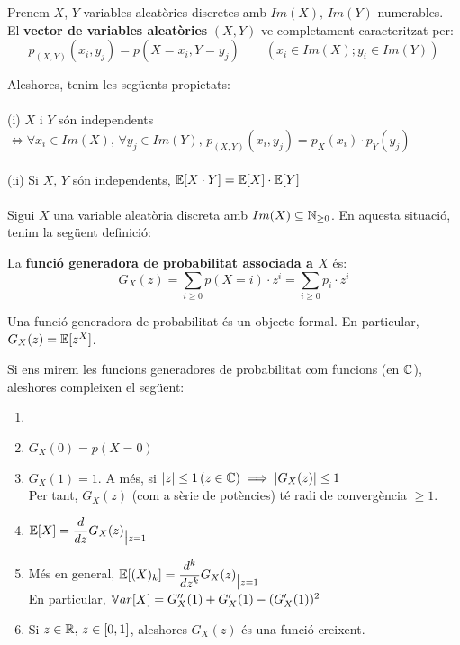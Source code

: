 \begin{defi}
  Prenem $X$, $Y$ variables aleatòries discretes amb $Im(X), \, Im(Y)$ numerables. \\
  El \textbf{vector de variables aleatòries} $(X,Y)$ ve completament caracteritzat per: 
  \[
    p_{(X,Y)}(x_{i},y_{j}) = p(X=x_{i}, Y=y_{j}) \qquad (x_{i}\in Im(X); y_{i}\in Im(Y))
  \]
\end{defi}

\newpage
Aleshores, tenim les següents propietats: \\\\
(i) $X$ i $Y$ són independents $\iff \forall x_{i}\in Im(X), \, \forall y_{j}\in Im(Y), 
\, p_{(X, Y)}(x_{i},y_{j}) = p_{X}(x_{i})\cdot p_{Y}(y_{j})$ \\\\
(ii) Si $X, \, Y$ són independents, $\mathbb{E}[X\cdot Y] = \mathbb{E}[X]\cdot \mathbb{E}[Y]$ \\\\

Sigui $X$ una variable aleatòria discreta amb $Im(X)\subseteq \mathbb{N}_{\geq0}$. En aquesta situació, 
tenim la següent definició:

\begin{defi}
  La \textbf{funció generadora de probabilitat associada a $X$} és: 
  \[
    G_{X}(z) = \sum_{i\geq 0}p(X=i)\cdot z^{i} = \sum_{i\geq 0}p_{i}\cdot z^{i}
  \]
  
  Una funció generadora de probabilitat és un objecte formal. En particular, $G_{X}(z)=\mathbb{E}[z^{X}]$.
\end{defi}

Si ens mirem les funcions generadores de probabilitat com funcions (en $\mathbb{C}$), aleshores compleixen el següent:

\begin{prop}
  \begin{enumerate}
      \item []
      \item $G_{X}(0) = p(X=0)$
      \item $G_{X}(1) = 1$. A més, si $\left\vert z \right\vert\leq 1 \, (z\in \mathbb{C}) \implies \left\vert G_{X}(z) \right\vert\leq 1$ \\
      Per tant, $G_{X}(z)$ (com a sèrie de potències) té radi de convergència $\geq 1$.
      \item $\mathbb{E}[X] = \dfrac{d}{dz}G_{X}(z)_{\big|z=1}$
      \item Més en general, $\mathbb{E}[(X)_{k}] = \dfrac{d^{k}}{dz^{k}}G_{X}(z)_{\big|z=1}$ \\
      En particular, $\mathbb{V} ar[X] = G_{X}''(1) + G_{X}'(1) - (G_{X}'(1))^{2}$
      \item Si $z\in \mathbb{R}, \, z \in [0,1]$, aleshores $G_{X}(z)$ és una funció creixent.
  \end{enumerate}
\end{prop}

